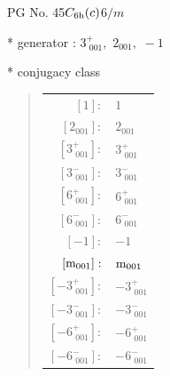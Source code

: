 \documentclass[fleqn,8pt]{jsarticle}
\begin{document}
\setcounter{MaxMatrixCols}{32}

\renewcommand{\tablename}{Table~}
\renewcommand{\figurename}{Figure~}
\begin{center}
\LARGE
PG No. 45\quad$C_{\rm 6h}(c)$\quad$6/m$\quad[ hexagonal ]
\end{center}

* generator : $3^{+}_{\,\,001},\,\,2{}_{001},\,\,-1$

* conjugacy class
\begin{quote}
\begin{tabular}{rl}
$ [1]: $ & $ 1 $ \\
$ [2{}_{001}]: $ & $ 2{}_{001} $ \\
$ [3^{+}_{\,\,001}]: $ & $ 3^{+}_{\,\,001} $ \\
$ [3^{-}_{\,\,001}]: $ & $ 3^{-}_{\,\,001} $ \\
$ [6^{+}_{\,\,001}]: $ & $ 6^{+}_{\,\,001} $ \\
$ [6^{-}_{\,\,001}]: $ & $ 6^{-}_{\,\,001} $ \\
$ [-1]: $ & $ -1 $ \\
$ [{\rm m}_{001}]: $ & $ {\rm m}_{001} $ \\
$ [-3^{+}_{\,\,001}]: $ & $ -3^{+}_{\,\,001} $ \\
$ [-3^{-}_{\,\,001}]: $ & $ -3^{-}_{\,\,001} $ \\
$ [-6^{+}_{\,\,001}]: $ & $ -6^{+}_{\,\,001} $ \\
$ [-6^{-}_{\,\,001}]: $ & $ -6^{-}_{\,\,001} $
\end{tabular}
\end{quote}
\end{document}
